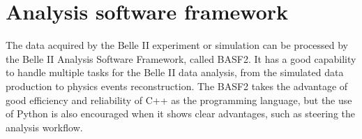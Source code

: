 \begin{comment}
The mixing of background is then implemented to provide a realistic view of physical events and beam background overlay. Since the format of beam background is simulated hits, thus adding the background events is done by injecting the simulated hits, then move to the digitization of hits to detector responses. In a event time window $\Delta t$, assuming the given type background has a average rate of $R$, the mixing number of background hits in such event is: 

\begin{equation}
\bar{N} = sR\Delta{t}
\end{equation}

$s$ is optional scaling factor which can be used to study the influence of given type background in different level. Because $R$ is averaged value, in the actual mixing, the number of $\bar{N}$ is used as the expected value of Poisson distribution, which presents the number of observed events when many trials of such events is made with certain small possibility per event.  In order to simulate the effect of timing different of background and physical events, the mixing timing window over $\Delta t$ is randomly shift according to the physical events.
With the real experimental data comes in handy, the method of adding background events to physics events is slightly different since using real beam background can provide a more precise result than simulation. By setting a random trigger for beam background, the hits digitization from real beam background will be collected and add to simulated physics events. Although the pile-up noise collected in this method is not very precise because of the threshold set for detectors allowing only part of noise to be added, the non-recorded noise can still contribute to the pile-up noise for physics events, and they are not included in this method. Yet overall it provides a more realistic evaluation of beam background overlay.

\end{comment}

\section{Analysis software framework} 
The data acquired by the Belle II experiment or simulation can be processed by the Belle II Analysis Software Framework, called BASF2. It has a good capability to handle multiple tasks for the Belle II data analysis, from the simulated data production to physics events reconstruction. The BASF2 takes the advantage of good efficiency and reliability of C++ as the programming language, but the use of
Python is also encouraged when it shows clear advantages, such as steering the analysis workflow. 

